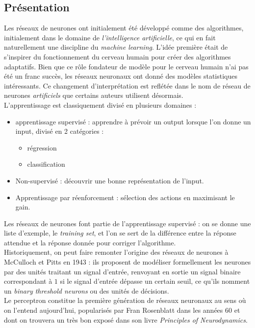 \documentclass{article}
\theoremstyle{definition}
\begin{document}
\subsection{Présentation}

Les réseaux de neurones ont initialement été développé comme des algorithmes, initialement dans le domaine de \textit{l'intelligence artificielle}, ce qui en fait naturellement une discipline du \textit{machine learning}. L'idée première était de s'inspirer du fonctionnement du cerveau humain pour créer des algorithmes adaptatifs. Bien que ce rôle fondateur de modèle pour le cerveau humain n'ai pas été un franc succès, les réseaux neuronaux ont donné des modèles statistiques intéressants. Ce changement d'interprétation est reflétée dans le nom de réseau de neurones \textit{artificiels} que certains auteurs utilisent désormais. \\

L'apprentissage est classiquement divisé en plusieurs domaines :
\begin{itemize}
\item apprentissage supervisé : apprendre à prévoir un output lorsque l'on donne un input, divisé en 2 catégories :
\begin{itemize}
\item régression 
\item classification
\end{itemize}
\item Non-supervisé : découvrir une bonne représentation de l'input.
\item Apprentissage par réenforcement : sélection des actions en maximisant le gain.\\
\end{itemize}
Les réseaux de neurones font partie de l'apprentissage supervisé : on se donne une liste d'exemple, le \textit{training set}, et l'on se sert de la différence entre la réponse attendue et la réponse donnée pour corriger l'algorithme.\\

Historiquement, on peut faire remonter l'origine des réseaux de neurones à McCulloch et Pitts en 1943 : ils proposent de modéliser formellement les neurones par des unités traitant un signal d'entrée, renvoyant en sortie un signal binaire correspondant à $1$ si le signal d'entrée dépasse un certain seuil, ce qu'ils nomment un \textit{binary threshold neurons} ou des unités de décisions.\\

Le perceptron constitue la première génération de réseaux neuronaux au sens où on l'entend aujourd'hui, popularisés par Fran Rosenblatt dans les années 60 et dont on trouvera un très bon exposé dans son livre \textit{Principles of Neurodynamics}.\\
\end{document}
